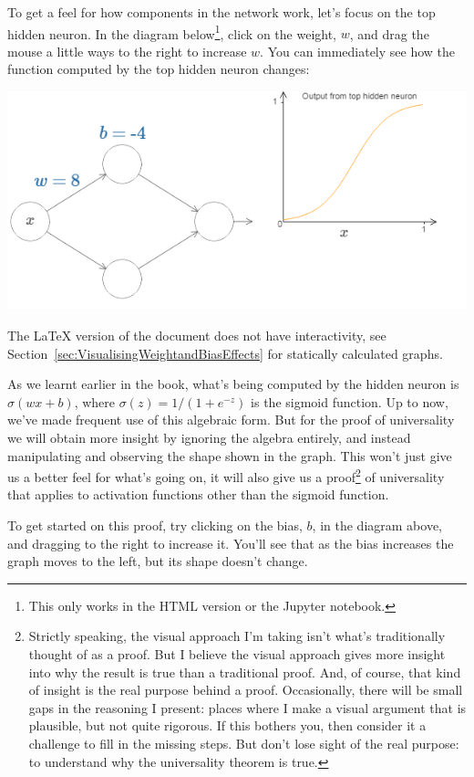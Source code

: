 To get a feel for how components in the network work, let's focus on the top hidden neuron. In the diagram below\footnote{This only works in the HTML version or the Jupyter notebook.}, click on the weight, $w$, and drag the mouse a little ways to the right to increase $w$. You can immediately see how the function computed by the top hidden neuron changes:

{\centering \includegraphics[width=\textwidth,]{pic/wigglyfn07.png} \par}

The \LaTeX{} version of the document  does not have interactivity, see Section~\ref{sec:VisualisingWeightandBiasEffects} for statically calculated graphs.


As we learnt earlier in the book, what's being computed by the hidden neuron is $\sigma (wx+b)$, where $\sigma(z)=1/(1+e^{-z})$ is the sigmoid function. Up to now, we've made frequent use of this algebraic form. But for the proof of universality we will obtain more insight by ignoring the algebra entirely, and instead manipulating and observing the shape shown in the graph. This won't just give us a better feel for what's going on, it will also give us a proof\footnote{Strictly speaking, the visual approach I'm taking isn't what's traditionally thought of as a proof. But I believe the visual approach gives more insight into why the result is true than a traditional proof. And, of course, that kind of insight is the real purpose behind a proof. Occasionally, there will be small gaps in the reasoning I present: places where I make a visual argument that is plausible, but not quite rigorous. If this bothers you, then consider it a challenge to fill in the missing steps. But don't lose sight of the real purpose: to understand why the universality theorem is true.} of universality that applies to activation functions other than the sigmoid function.

To get started on this proof, try clicking on the bias, $b$, in the diagram above, and dragging to the right to increase it. You'll see that as the bias increases the graph moves to the left, but its shape doesn't change.

